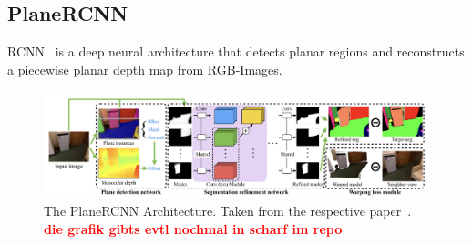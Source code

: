 \documentclass[main.tex]{subfiles}
\begin{document}
\subsection{PlaneRCNN}
RCNN~\cite{Liu_Kim_Gu_Furukawa_Kautz_2019} is a deep neural architecture that detects planar 
regions and reconstructs a piecewise planar depth map from RGB-Images.

\begin{figure}[H]
    \centering
    \includegraphics[width=\textwidth]{images/planercnn.png}
    \caption[PlaneRCNN Architecture]{The PlaneRCNN Architecture. Taken from the respective paper~\cite{Liu_Kim_Gu_Furukawa_Kautz_2019}. 
    \textbf{\textcolor{red}{die grafik gibts evtl nochmal in scharf im repo}}}
\end{figure}
\end{document}
